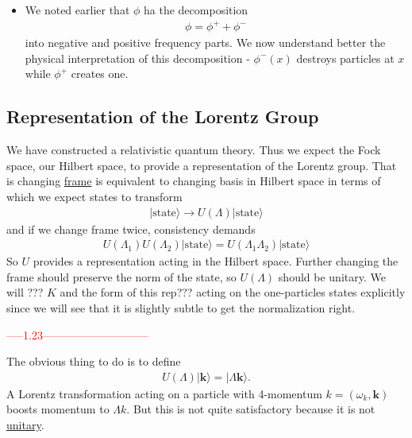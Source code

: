 \documentclass{article}
\begin{document}
\begin{itemize}
\item We noted earlier that $\phi$ ha the decomposition
\begin{align}
\phi=\phi^++\phi^-
\end{align}
into negative and positive frequency parts. We now understand better the physical interpretation of this decomposition - $\phi^-(x)$ destroys particles at $x$ while $\phi^+$ creates one.
\end{itemize}

\subsection{Representation of the Lorentz Group}

We have constructed a relativistic quantum theory. Thus we expect the Fock space, our Hilbert space, to provide a representation of the Lorentz group. That is changing \underline{frame} is equivalent to changing basis in Hilbert space in terms of which we expect states to transform
\begin{align}
|\text{state}\rangle \rightarrow U(\Lambda)|\text{state}\rangle
\end{align}
and if we change frame twice, consistency demands
\begin{align}
U(\Lambda_1)U(\Lambda_2)|\text{state}\rangle=U(\Lambda_1 \Lambda_2)|\text{state}\rangle
\end{align}
So $U$ provides a representation acting in the Hilbert space. Further changing the frame should preserve the norm of the state, so $U(\Lambda)$ should be unitary. We will ??? $K$ and the form of this rep??? acting on the one-particles states explicitly since we will see that it is slightly subtle to get the normalization right.

\textcolor{red}{-----1.23-----------------------------}
\newline

The obvious thing to do is to define
\begin{align}
U(\Lambda)|\mathbf{k}\rangle=|\Lambda\mathbf{k}\rangle.
\end{align}
A Lorentz transformation acting on a particle with 4-momentum 
$k=(\omega_k,\mathbf{k})$ boosts momentum to $\Lambda k$. But this is not quite satisfactory because it is not \underline{unitary}.
\end{document}
